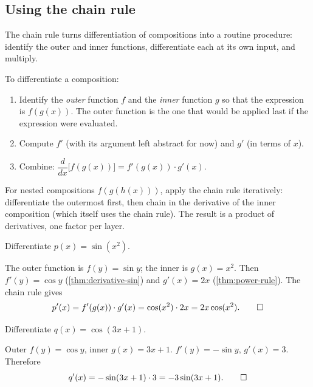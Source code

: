 \subsection{Using the chain rule}

The chain rule turns differentiation of compositions into a routine procedure: identify the outer and inner functions, differentiate each at its own input, and multiply.

\begin{strategy}[Differentiating \(f(g(x))\)]
To differentiate a composition:
\begin{enumerate}
    \item Identify the \emph{outer} function \(f\) and the \emph{inner} function \(g\) so that the expression is \(f(g(x))\). The outer function is the one that would be applied last if the expression were evaluated.
    \item Compute \(f'\) (with its argument left abstract for now) and \(g'\) (in terms of \(x\)).
    \item Combine: \(\dfrac{d}{dx}\bigl[f(g(x))\bigr] = f'(g(x)) \cdot g'(x)\).
\end{enumerate}
For nested compositions \(f(g(h(x)))\), apply the chain rule iteratively: differentiate the outermost first, then chain in the derivative of the inner composition (which itself uses the chain rule). The result is a product of derivatives, one factor per layer.
\end{strategy}

\begin{workedexample}
\begin{example}\label{ex:chain-rule-sin-x-squared}
Differentiate \(p(x) = \sin(x^{2})\).
\end{example}

\begin{solution}
The outer function is \(f(y) = \sin y\); the inner is \(g(x) = x^{2}\). Then \(f'(y) = \cos y\) (\cref{thm:derivative-sin}) and \(g'(x) = 2x\) (\cref{thm:power-rule}). The chain rule gives
\[
p'(x) = f'(g(x)) \cdot g'(x) = \cos(x^{2}) \cdot 2x = 2x \cos(x^{2}). \qedhere
\]
\end{solution}
\end{workedexample}

\begin{workedexample}
\begin{example}\label{ex:chain-rule-cos-3x-plus-1}
Differentiate \(q(x) = \cos(3x + 1)\).
\end{example}

\begin{solution}
Outer \(f(y) = \cos y\), inner \(g(x) = 3x + 1\). \(f'(y) = -\sin y\), \(g'(x) = 3\). Therefore
\[
q'(x) = -\sin(3x + 1) \cdot 3 = -3 \sin(3x + 1). \qedhere
\]
\end{solution}
\end{workedexample}

